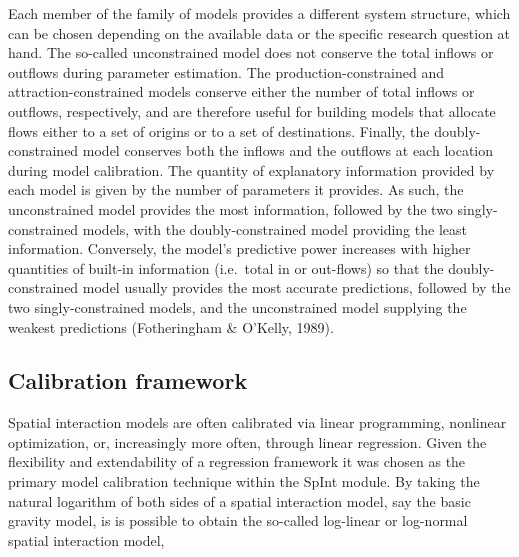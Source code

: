 \documentclass[11pt]{article}
\begin{document}
Each member of the family of models provides a different system
structure, which can be chosen depending on the available data or the
specific research question at hand. The so-called unconstrained model
does not conserve the total inflows or outflows during parameter
estimation. The production-constrained and attraction-constrained models
conserve either the number of total inflows or outflows, respectively,
and are therefore useful for building models that allocate flows either
to a set of origins or to a set of destinations. Finally, the
doubly-constrained model conserves both the inflows and the outflows at
each location during model calibration. The quantity of explanatory
information provided by each model is given by the number of parameters
it provides. As such, the unconstrained model provides the most
information, followed by the two singly-constrained models, with the
doubly-constrained model providing the least information. Conversely,
the model's predictive power increases with higher quantities of
built-in information (i.e.~total in or out-flows) so that the
doubly-constrained model usually provides the most accurate predictions,
followed by the two singly-constrained models, and the unconstrained
model supplying the weakest predictions (Fotheringham \& O'Kelly, 1989).

    \subsection{Calibration framework}\label{calibration-framework}

    Spatial interaction models are often calibrated via linear programming,
nonlinear optimization, or, increasingly more often, through linear
regression. Given the flexibility and extendability of a regression
framework it was chosen as the primary model calibration technique
within the SpInt module. By taking the natural logarithm of both sides
of a spatial interaction model, say the basic gravity model, is is
possible to obtain the so-called log-linear or log-normal spatial
interaction model,
\end{document}
